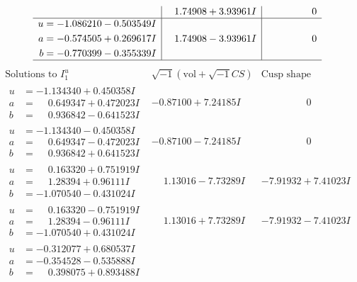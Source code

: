 \documentclass[1p]{elsarticle_modified}
\theoremstyle{definition}
\newcommand{\I}{\sqrt{-1}}
\begin{document}
$$\begin{array}{c|c|c}
 & \phantom{-}1.74908 + 3.93961 I & \phantom{-0.000000 } 0 \\ \hline\begin{aligned}
u &= -1.086210 - 0.503549 I \\
a &= -0.574505 + 0.269617 I \\
b &= -0.770399 - 0.355339 I\end{aligned}
 & \phantom{-}1.74908 - 3.93961 I & \phantom{-0.000000 } 0\\
 \hline 
 \end{array}$$\newpage$$\begin{array}{c|c|c}  
\text{Solutions to }I^u_{1}& \I (\text{vol} + \sqrt{-1}CS) & \text{Cusp shape}\\
 \hline 
\begin{aligned}
u &= -1.134340 + 0.450358 I \\
a &= \phantom{-}0.649347 + 0.472023 I \\
b &= \phantom{-}0.936842 - 0.641523 I\end{aligned}
 & -0.87100 + 7.24185 I & \phantom{-0.000000 } 0 \\ \hline\begin{aligned}
u &= -1.134340 - 0.450358 I \\
a &= \phantom{-}0.649347 - 0.472023 I \\
b &= \phantom{-}0.936842 + 0.641523 I\end{aligned}
 & -0.87100 - 7.24185 I & \phantom{-0.000000 } 0 \\ \hline\begin{aligned}
u &= \phantom{-}0.163320 + 0.751919 I \\
a &= \phantom{-}1.28394 + 0.96111 I \\
b &= -1.070540 - 0.431024 I\end{aligned}
 & \phantom{-}1.13016 - 7.73289 I & -7.91932 + 7.41023 I \\ \hline\begin{aligned}
u &= \phantom{-}0.163320 - 0.751919 I \\
a &= \phantom{-}1.28394 - 0.96111 I \\
b &= -1.070540 + 0.431024 I\end{aligned}
 & \phantom{-}1.13016 + 7.73289 I & -7.91932 - 7.41023 I \\ \hline\begin{aligned}
u &= -0.312077 + 0.680537 I \\
a &= -0.354528 - 0.535888 I \\
b &= \phantom{-}0.398075 + 0.893488 I\end{aligned}

\end{array}$$
\end{document}
